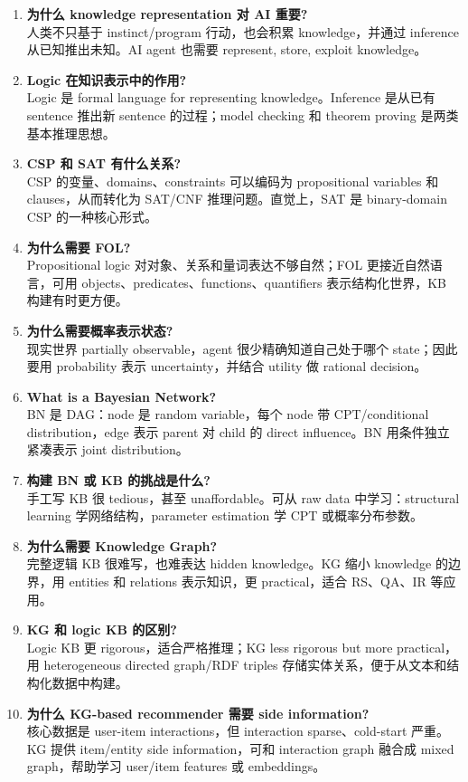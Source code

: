 \documentclass[UTF8,11pt,a4paper]{ctexart}
\begin{document}
\begin{enumerate}
\item \textbf{为什么 knowledge representation 对 AI 重要?}\\
人类不只基于 instinct/program 行动，也会积累 knowledge，并通过 inference 从已知推出未知。AI agent 也需要 represent, store, exploit knowledge。

\item \textbf{Logic 在知识表示中的作用?}\\
Logic 是 formal language for representing knowledge。Inference 是从已有 sentence 推出新 sentence 的过程；model checking 和 theorem proving 是两类基本推理思想。

\item \textbf{CSP 和 SAT 有什么关系?}\\
CSP 的变量、domains、constraints 可以编码为 propositional variables 和 clauses，从而转化为 SAT/CNF 推理问题。直觉上，SAT 是 binary-domain CSP 的一种核心形式。

\item \textbf{为什么需要 FOL?}\\
Propositional logic 对对象、关系和量词表达不够自然；FOL 更接近自然语言，可用 objects、predicates、functions、quantifiers 表示结构化世界，KB 构建有时更方便。

\item \textbf{为什么需要概率表示状态?}\\
现实世界 partially observable，agent 很少精确知道自己处于哪个 state；因此要用 probability 表示 uncertainty，并结合 utility 做 rational decision。

\item \textbf{What is a Bayesian Network?}\\
BN 是 DAG：node 是 random variable，每个 node 带 CPT/conditional distribution，edge 表示 parent 对 child 的 direct influence。BN 用条件独立紧凑表示 joint distribution。

\item \textbf{构建 BN 或 KB 的挑战是什么?}\\
手工写 KB 很 tedious，甚至 unaffordable。可从 raw data 中学习：structural learning 学网络结构，parameter estimation 学 CPT 或概率分布参数。

\item \textbf{为什么需要 Knowledge Graph?}\\
完整逻辑 KB 很难写，也难表达 hidden knowledge。KG 缩小 knowledge 的边界，用 entities 和 relations 表示知识，更 practical，适合 RS、QA、IR 等应用。

\item \textbf{KG 和 logic KB 的区别?}\\
Logic KB 更 rigorous，适合严格推理；KG less rigorous but more practical，用 heterogeneous directed graph/RDF triples 存储实体关系，便于从文本和结构化数据中构建。

\item \textbf{为什么 KG-based recommender 需要 side information?}\\
核心数据是 user-item interactions，但 interaction sparse、cold-start 严重。KG 提供 item/entity side information，可和 interaction graph 融合成 mixed graph，帮助学习 user/item features 或 embeddings。
\end{enumerate}
\end{document}
